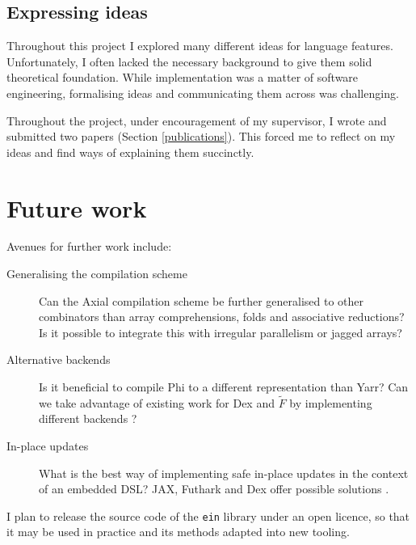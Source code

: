 \subsection{Expressing ideas}

Throughout this project I explored many different ideas for language features. 
Unfortunately, I often lacked the necessary background to give them solid theoretical foundation. 
While implementation was a matter of software engineering, formalising ideas and communicating them across was challenging. 

Throughout the project, under encouragement of my supervisor, I wrote and submitted two papers (Section \ref{publications}). 
This forced me to reflect on my ideas and find ways of explaining them succinctly.

\section{Future work}

Avenues for further work include:
\begin{description}
    \item[Generalising the compilation scheme] Can the Axial compilation scheme be further generalised to other combinators than array comprehensions, folds and associative reductions? Is it possible to integrate this with irregular parallelism or jagged arrays?
    \item[Alternative backends] Is it beneficial to compile Phi to a different representation than Yarr? 
    Can we take advantage of existing work for Dex and $\tilde F$ by implementing different backends \cite{shaikhha2019efficient, paszke2021getting}?
    \item[In-place updates] What is the best way of implementing safe in-place updates in the context of an embedded DSL? 
    JAX, Futhark and Dex offer possible solutions \cite{frostig2018compiling, henriksen2017futhark, paszke2021getting}.
\end{description}
I plan to release the source code of the \texttt{ein} library under an open licence, so that it may be used in practice and its methods adapted into new tooling.